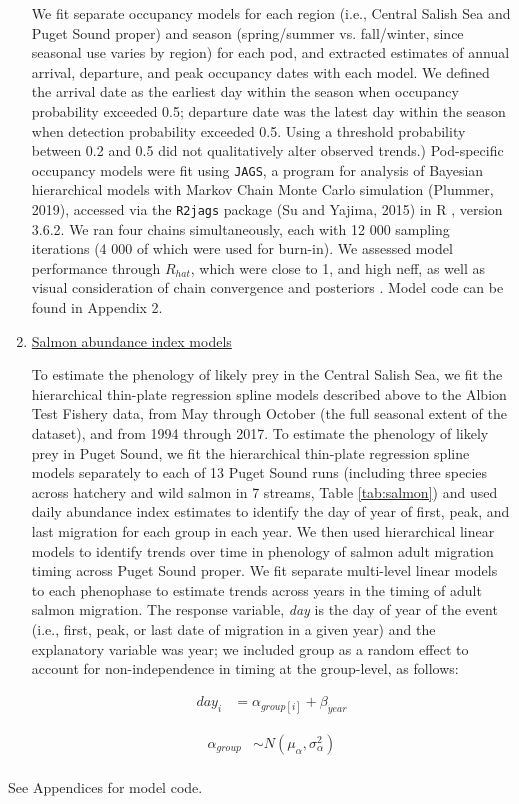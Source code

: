 \documentclass{article}
\begin{document}
\begin{enumerate}
 
\par We fit separate occupancy models for each region (i.e., Central Salish Sea and Puget Sound proper) and season (spring/summer vs. fall/winter, since seasonal use varies by region) for each pod, and extracted estimates of annual arrival, departure, and peak occupancy dates with each model. We defined the arrival date as the earliest day within the season when occupancy probability exceeded 0.5; departure date was the latest day within the season when detection probability exceeded 0.5. Using a threshold probability between 0.2 and 0.5 did not qualitatively alter observed trends.) Pod-specific occupancy models were fit using \texttt{JAGS}, a program for analysis of Bayesian hierarchical models with Markov Chain Monte Carlo simulation (Plummer, 2019), accessed via the \texttt{R2jags} package (Su and Yajima, 2015) in R \citep{Rcore2019}, version 3.6.2. We ran four chains simultaneously, each with 12 000 sampling iterations (4 000 of which were used for burn-in). We assessed model performance through $R_{hat}$, which were close to 1, and high neff, as well as visual consideration of chain convergence and posteriors \citep{BDA}. Model code can be found in Appendix 2.
\item \underline {Salmon abundance index models}
\par To estimate the phenology of likely prey in the Central Salish Sea, we fit the hierarchical thin-plate regression spline models described above to the Albion Test Fishery data, from May through October (the full seasonal extent of the dataset), and from 1994 through 2017. To estimate the phenology of likely prey in Puget Sound, we fit the hierarchical thin-plate regression spline models separately to each of 13 Puget Sound runs (including three species across hatchery and wild salmon in 7 streams, Table \ref{tab:salmon}) and used daily abundance index estimates to identify the day of year of first, peak, and last migration for each group in each year. We then used hierarchical linear models to identify trends over time in phenology of salmon adult migration timing across Puget Sound proper.  We fit  separate multi-level linear models to each phenophase to estimate trends across years in the timing of adult salmon migration. The response variable, \emph{day} is the day of year of the event (i.e., first, peak, or last date of migration in a given year) and the explanatory variable was year; we included group as a random effect to account for non-independence in timing at the group-level, as follows:

\begin{align*}
day_i &= \alpha_{group[i]} + \beta_{year}
\end{align*}

\begin{align*}
\alpha_{group} & \sim N(\mu_{\alpha}, \sigma^{2}_{\alpha}) \\
\end{align*}

\end{enumerate}
See Appendices for model code.
\end{document}
